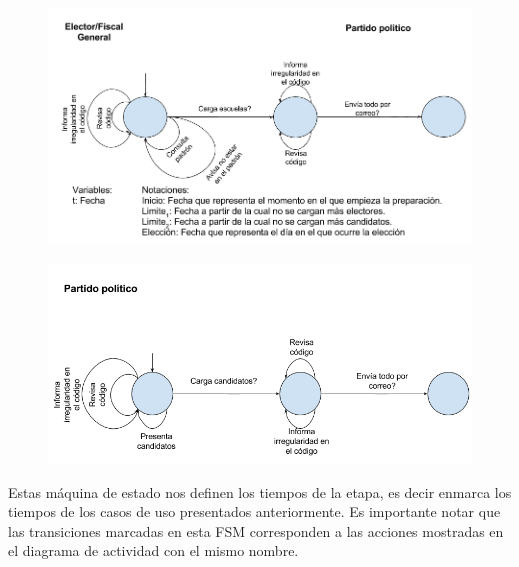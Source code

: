 \begin{figure}[h!]
\centering
\includegraphics[scale=0.45]{imagenes/FSMs/Preparacion/Fechaslimite2}
\end{figure}

\begin{figure}[h!]
\centering
\includegraphics[scale=0.45]{imagenes/FSMs/Preparacion/Fechaslimite3}
\end{figure}
Estas máquina de estado nos definen los tiempos de la etapa, es decir enmarca los tiempos de los casos de uso presentados anteriormente. Es importante notar que las transiciones marcadas en esta FSM corresponden a las acciones mostradas en el diagrama de actividad con el mismo nombre.

